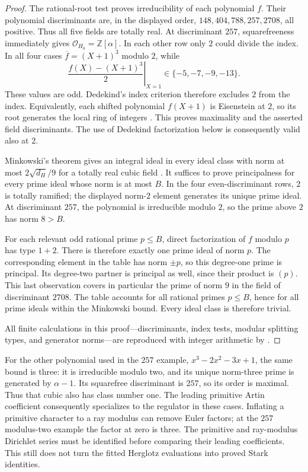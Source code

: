 \begin{proof}
The rational-root test proves irreducibility of each polynomial $f$.
Their polynomial discriminants are, in the displayed order,
$148,404,788,257,2708$, all positive.  Thus all five fields are
totally real.  At discriminant $257$, squarefreeness immediately gives
$\mathcal O_{H_0}=\mathbb Z[\alpha]$.  In each other row only $2$
could divide the index.  In all four cases
$\overline f=(X+1)^3$ modulo $2$, while
\[
 \left.\frac{f(X)-(X+1)^3}{2}\right|_{X=1}
                  \in\{-5,-7,-9,-13\}.
\]
These values are odd.  Dedekind's index criterion therefore excludes
$2$ from the index.  Equivalently, each shifted polynomial $f(X+1)$
is Eisenstein at $2$, so its root generates the local ring of integers
\cite[Proposition~7.55 and Remark~7.56]{loggamma:MilneANT}.  This proves
maximality and the asserted field discriminants.  The use of Dedekind factorization below is consequently
valid also at $2$.

Minkowski's theorem gives an integral ideal in every ideal class
with norm at most $2\sqrt{d_H}/9$ for a totally real cubic field
\cite{loggamma:MilneANT}.  It suffices to prove principalness for every prime
ideal whose norm is at most $B$.  In the four even-discriminant rows,
$2$ is totally ramified; the displayed norm-$2$ element generates its
unique prime ideal.  At discriminant $257$, the polynomial is
irreducible modulo $2$, so the prime above $2$ has norm $8>B$.

For each relevant odd rational prime $p\leq B$, direct factorization
of $f$ modulo $p$ has type $1+2$.  There is therefore exactly one
prime ideal of norm $p$.  The corresponding element in the table
has norm $\pm p$, so this degree-one prime is principal.  Its
degree-two partner is principal as well, since their product is
$(p)$.  This last observation covers in particular the prime of
norm $9$ in the field of discriminant $2708$.  The table accounts
for all rational primes $p\leq B$, hence for all prime ideals within
the Minkowski bound.  Every ideal class is therefore trivial.

All finite calculations in this proof---discriminants, index tests,
modular splitting types, and generator norms---are reproduced with
integer arithmetic by .
\end{proof}


For the other polynomial used in the $257$ example,
$x^3-2x^2-3x+1$, the same bound is three: it is irreducible modulo two,
and its unique norm-three prime is generated by $\alpha-1$.
Its squarefree discriminant is $257$, so its order is maximal.
Thus that cubic also has class number one.
The leading primitive Artin coefficient consequently specializes to the
regulator in these cases. Inflating a primitive character to a ray modulus
can remove Euler factors; at the $257$ modulus-two example the factor at
zero is three. The primitive and ray-modulus Dirichlet series must be
identified before comparing their leading coefficients. This still does
not turn the fitted Herglotz evaluations into proved Stark identities.
